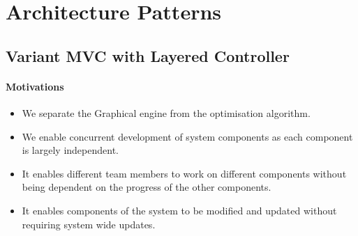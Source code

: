 \documentclass[11pt]{article}
\begin{document}
\section{Architecture Patterns}
\subsection{Variant MVC with Layered Controller}
\paragraph{Motivations}
\begin{itemize}
\item We separate the Graphical engine from the optimisation algorithm.
\item We enable concurrent development of system components as each component is largely independent.
\item It enables different team members to work on different components without being dependent on the progress of the other components.
\item It enables components of the system to be modified and updated without requiring system wide updates.
\end{itemize}
\end{document}

